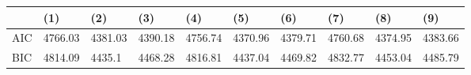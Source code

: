 \begin{tabular}{llllllllll}
\hline 
& (1) & (2) & (3) & (4) & (5) & (6) & (7) & (8) & (9) \\ 
\hline 
AIC & 4766.03 & 4381.03 & 4390.18 & 4756.74 & 4370.96 & 4379.71 & 4760.68 & 4374.95 & 4383.66 \\ 
BIC & 4814.09 & 4435.1 & 4468.28 & 4816.81 & 4437.04 & 4469.82 & 4832.77 & 4453.04 & 4485.79 \\ 
\hline 
\end{tabular}